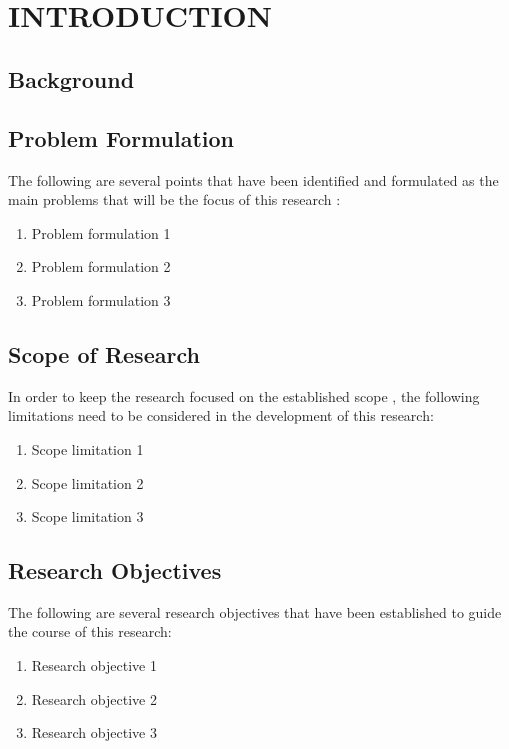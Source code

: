 \chapter[INTRODUCTION]{\\ INTRODUCTION}

\section{Background}

\lipsum[1]

\section{Problem Formulation}
The following are several points that have been identified and formulated as the main problems that will be the focus of this research \cite{chan2013review}:
\begin{enumerate}
    \item Problem formulation 1
    \item Problem formulation 2
    \item Problem formulation 3	
\end{enumerate}

\section{Scope of Research}
In order to keep the research focused on the established scope \cite{muhammadred}, the following limitations need to be considered in the development of this research:
\begin{enumerate}
    \item Scope limitation 1
    \item Scope limitation 2
    \item Scope limitation 3
\end{enumerate}

\section{Research Objectives}
The following are several research objectives that have been established to guide the course of this research: 
\begin{enumerate}
    \item Research objective 1
    \item Research objective 2
    \item Research objective 3
\end{enumerate}

